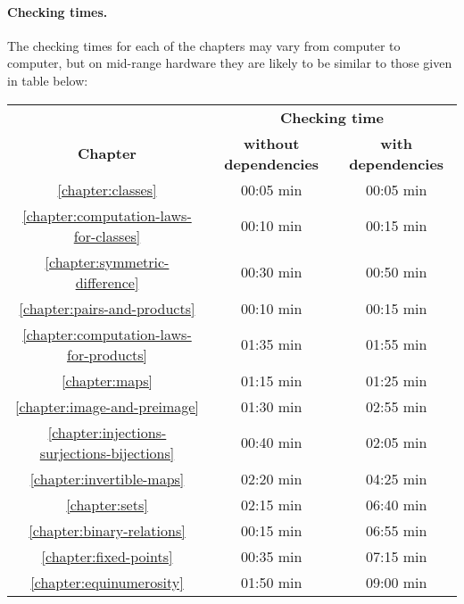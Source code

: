 \documentclass[12pt,oneside]{book}
\begin{document}
  \paragraph*{Checking times.}
  The checking times for each of the chapters may vary from computer to
  computer, but on mid-range hardware they are likely to be similar to those
  given in table below:

  \begin{center}
    \begin{tabular}{c|c|c}

      & \multicolumn{2}{c}{\textbf{Checking time}}
      \\
      \textbf{Chapter}
      & \textbf{without dependencies}     & \textbf{with dependencies}
      \\ \hline
      \ref{chapter:classes}
      & 00:05 min                         & 00:05 min
      \\
      \ref{chapter:computation-laws-for-classes}
      & 00:10 min                         & 00:15 min
      \\
      \ref{chapter:symmetric-difference}
      & 00:30 min                         & 00:50 min
      \\
      \ref{chapter:pairs-and-products}
      & 00:10 min                         & 00:15 min
      \\
      \ref{chapter:computation-laws-for-products}
      & 01:35 min                         & 01:55 min
      \\
      \ref{chapter:maps}
      & 01:15 min                         & 01:25 min
      \\
      \ref{chapter:image-and-preimage}
      & 01:30 min                         & 02:55 min
      \\
      \ref{chapter:injections-surjections-bijections}
      & 00:40 min                         & 02:05 min
      \\
      \ref{chapter:invertible-maps}
      & 02:20 min                         & 04:25 min
      \\
      \ref{chapter:sets}
      & 02:15 min                         & 06:40 min
      \\
      \ref{chapter:binary-relations}
      & 00:15 min                         & 06:55 min
      \\
      \ref{chapter:fixed-points}
      & 00:35 min                         & 07:15 min
      \\
      \ref{chapter:equinumerosity}
      & 01:50 min                         & 09:00 min
    \end{tabular}
  \end{center}
\end{document}

